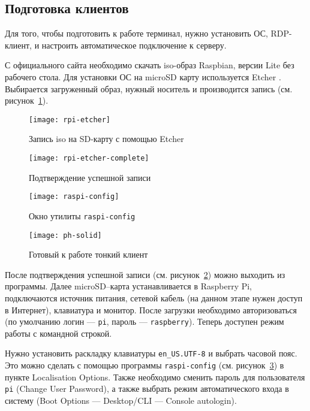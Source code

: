 \clearpage
\subsection{Подготовка клиентов}

Для того, чтобы подготовить к работе терминал, нужно установить ОС, RDP-клиент, и 
настроить автоматическое подключение к серверу.

С официального сайта \cite{ref:raspbian} необходимо скачать iso-образ Raspbian, версии
Lite без рабочего стола. Для установки ОС на microSD карту используется Etcher
\cite{ref:etcher}. Выбирается загруженный образ, нужный носитель и производится запись
(см. рисунок~\ref{pic:rpi-etcher}).

\begin{figure}[h]
    \center
    \texttt{[image: rpi-etcher]}
    \caption{Запись iso на SD-карту с помощью Etcher}
    \label{pic:rpi-etcher}
\end{figure}

\begin{figure}[h]
    \center
    \texttt{[image: rpi-etcher-complete]}
    \caption{Подтверждение успешной записи}
    \label{pic:rpi-etcher-complete}
\end{figure}

\begin{figure}[h]
    \center
    \texttt{[image: raspi-config]}
    \caption{Окно утилиты \texttt{raspi-config}}
    \label{pic:raspi-config}
\end{figure}

\begin{figure}[h]
    \center
    \texttt{[image: ph-solid]}
    \caption{Готовый к работе тонкий клиент}
    \label{pic:ph-solid}
\end{figure}

После подтверждения успешной записи (см. рисунок~\ref{pic:rpi-etcher-complete}) можно
выходить из программы. Далее microSD–карта устанавливается в Raspberry Pi, подключаются
источник питания, сетевой кабель (на данном этапе нужен доступ в Интернет), клавиатура 
и монитор. После загрузки необходимо авторизоваться (по умолчанию логин — 
\texttt{pi}, пароль — \texttt{raspberry}). Теперь доступен режим работы с командной
строкой.

Нужно установить раскладку клавиатуры \texttt{en\_US.UTF-8} и выбрать часовой пояс. Это
можно сделать с помощью программы \texttt{raspi-config} (см.
рисунок~\ref{pic:raspi-config}) в пункте Localisation Options.  Также необходимо сменить
пароль для пользователя \texttt{pi} (Change User Password), а также выбрать режим
автоматического входа в систему (Boot Options — Desktop/CLI — Console autologin).

